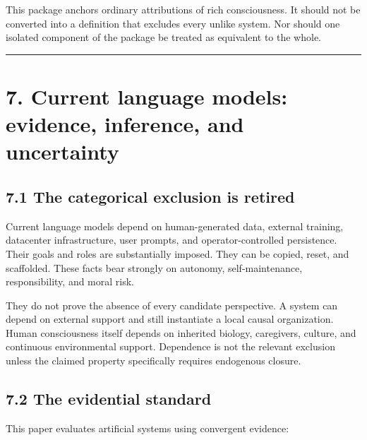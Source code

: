 \documentclass[
  11pt,
]{article}
\begin{document}
This package anchors ordinary attributions of rich consciousness. It
should not be converted into a definition that excludes every unlike
system. Nor should one isolated component of the package be treated as
equivalent to the whole.

\begin{center}\rule{0.5\linewidth}{0.5pt}\end{center}

\section{7. Current language models: evidence, inference, and
uncertainty}\label{current-language-models-evidence-inference-and-uncertainty}

\subsection{7.1 The categorical exclusion is
retired}\label{the-categorical-exclusion-is-retired}

Current language models depend on human-generated data, external
training, datacenter infrastructure, user prompts, and
operator-controlled persistence. Their goals and roles are substantially
imposed. They can be copied, reset, and scaffolded. These facts bear
strongly on autonomy, self-maintenance, responsibility, and moral risk.

They do not prove the absence of every candidate perspective. A system
can depend on external support and still instantiate a local causal
organization. Human consciousness itself depends on inherited biology,
caregivers, culture, and continuous environmental support. Dependence is
not the relevant exclusion unless the claimed property specifically
requires endogenous closure.

\subsection{7.2 The evidential standard}\label{the-evidential-standard}

This paper evaluates artificial systems using convergent evidence:
\end{document}
